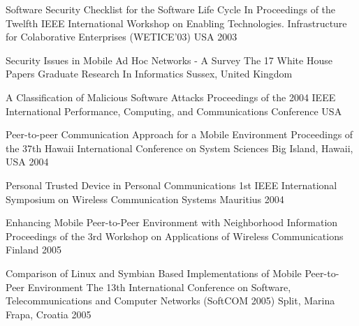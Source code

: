 \begin{thebibliography}{9}
		{
			\biband
			\biband
			}
		{Software Security Checklist for the Software Life Cycle}
		{In Proceedings of the Twelfth {IEEE} International Workshop on Enabling Technologies. Infrastructure for Colaborative Enterprises ({WETICE}'03)}
		{USA}
		{2003}
	
		{
			\biband
			}
		{Security Issues in Mobile Ad Hoc Networks - A Survey}
		{The 17 White House Papers Graduate Research In Informatics}
		{Sussex, United Kingdom}
		{}
	
		{
			\biband
			}
		{A Classification of Malicious Software Attacks}
		{Proceedings of the 2004 IEEE International Performance, Computing, and Communications Conference}
		{USA}
		{}
	
		{
			\biband
			\biband
			}
		{Peer-to-peer Communication Approach for a Mobile Environment}
		{Proceedings of the 37th {H}awaii International Conference on System Sciences}
		{Big Island, Hawaii, USA}
		{2004}
	
		{
			\biband
			\biband
			\biband
			\biband
			\biband
			\biband
			}
		{Personal Trusted Device in Personal Communications}
		{1st {IEEE} International Symposium on Wireless Communication Systems}
		{Mauritius}
		{2004}
	
		{
			\biband
			}
		{Enhancing Mobile Peer-to-Peer Environment with Neighborhood Information}
		{Proceedings of the 3rd Workshop on Applications of Wireless Communications}
		{Finland}
		{2005}
	
		{
			\biband
			\biband
			}
		{Comparison of {L}inux and {S}ymbian Based Implementations of Mobile Peer-to-Peer Environment}
		{The 13th International Conference on Software, Telecommunications and Computer Networks ({SoftCOM} 2005)}
		{Split, Marina Frapa, Croatia}
		{2005}
	

\end{thebibliography}
